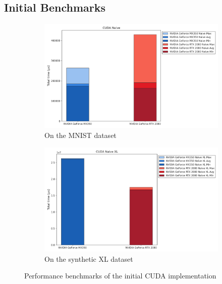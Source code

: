 \documentclass[modern,longauthor]{aastex7}
\begin{document}
\subsection{Initial Benchmarks}
\begin{figure}[htb!]
\centering
\begin{subfigure}{.5\textwidth}
  \centering
  \includegraphics[width=\linewidth]{Graphs/CUDA.png}
  \caption{On the MNIST dataset}
\end{subfigure}%
\begin{subfigure}{.5\textwidth}
  \centering
  \includegraphics[width=\linewidth]{Graphs/CUDA XL.png}
  \caption{On the synthetic XL dataset}
\end{subfigure}
\caption{Performance benchmarks of the initial CUDA implementation}
\label{fig:cuda-initial}
\end{figure}
\end{document}
